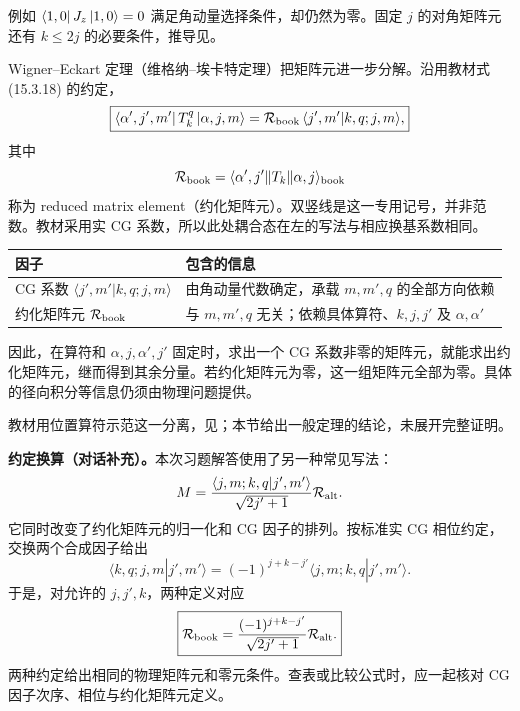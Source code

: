 例如 $\left\langle 1,0\right|J_z\left|1,0\right\rangle=0$ 满足角动量选择条件，却仍然为零。固定 $j$ 的对角矩阵元还有 $k\le2j$ 的必要条件，推导见。

Wigner--Eckart 定理（维格纳--埃卡特定理）把矩阵元进一步分解。沿用教材式 (15.3.18) 的约定，
\begin{equation}
  \boxed{\left\langle \alpha',j',m'\right|T_k^q\left|\alpha,j,m\right\rangle
    =\mathcal R_{\rm book}\,\langle j',m'|k,q;j,m\rangle,}
\end{equation}
其中
\begin{equation}
  \mathcal R_{\rm book}
    =\langle\alpha',j'\|T_k\|\alpha,j\rangle_{\rm book}
\end{equation}
称为 reduced matrix element（约化矩阵元）。双竖线是这一专用记号，并非范数。教材采用实 CG 系数，所以此处耦合态在左的写法与相应换基系数相同。

\begin{center}
\begin{tabularx}{\textwidth}{@{}lX@{}}
  \toprule
  因子 & 包含的信息 \\
  \midrule
  CG 系数 $\langle j',m'|k,q;j,m\rangle$ & 由角动量代数确定，承载 $m,m',q$ 的全部方向依赖 \\
  约化矩阵元 $\mathcal R_{\rm book}$ & 与 $m,m',q$ 无关；依赖具体算符、$k,j,j'$ 及 $\alpha,\alpha'$ \\
  \bottomrule
\end{tabularx}
\end{center}
因此，在算符和 $\alpha,j,\alpha',j'$ 固定时，求出一个 CG 系数非零的矩阵元，就能求出约化矩阵元，继而得到其余分量。若约化矩阵元为零，这一组矩阵元全部为零。具体的径向积分等信息仍须由物理问题提供。

教材用位置算符示范这一分离，见；本节给出一般定理的结论，未展开完整证明。

\textbf{约定换算（对话补充）。}本次习题解答使用了另一种常见写法：
\begin{equation}
  M=\frac{\langle j,m;k,q|j',m'\rangle}{\sqrt{2j'+1}}
       \mathcal R_{\rm alt}.
\end{equation}
它同时改变了约化矩阵元的归一化和 CG 因子的排列。按标准实 CG 相位约定，交换两个合成因子给出
\begin{equation}
  \langle k,q;j,m|j',m'\rangle
    =(-1)^{j+k-j'}\langle j,m;k,q|j',m'\rangle.
\end{equation}
于是，对允许的 $j,j',k$，两种定义对应
\begin{equation}
  \boxed{\mathcal R_{\rm book}
     =\frac{(-1)^{j+k-j'}}{\sqrt{2j'+1}}\mathcal R_{\rm alt}.}
\end{equation}
两种约定给出相同的物理矩阵元和零元条件。查表或比较公式时，应一起核对 CG 因子次序、相位与约化矩阵元定义。

